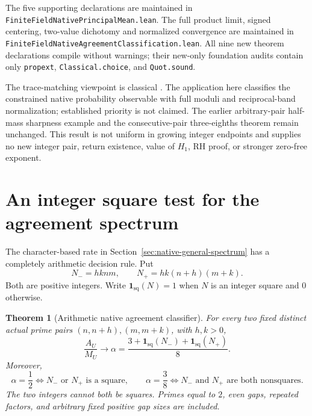 \documentclass[11pt]{article}
\newtheorem{theorem}{Theorem}[section]
\begin{document}
The five supporting declarations are maintained in
\texttt{FiniteFieldNativePrincipalMean.lean}.
The full product limit, signed centering, two-value dichotomy and
normalized convergence are maintained in
\texttt{FiniteFieldNativeAgreementClassification.lean}.
All nine new theorem declarations compile without warnings;
their new-only foundation audits contain only
\texttt{propext}, \texttt{Classical.choice}, and \texttt{Quot.sound}.

The trace-matching viewpoint is classical
\cite[Definition~1.1 and Theorem~1.2]{WaljiMatchingDensities}.
The application here classifies the constrained native probability
observable with full moduli and reciprocal-band normalization;
established priority is not claimed.
The earlier arbitrary-pair half-mass sharpness example and the
consecutive-pair three-eighths theorem remain unchanged.
This result is not uniform in growing integer endpoints and supplies
no new integer pair, return existence, value of \(H_1\), RH proof,
or stronger zero-free exponent.

\section{An integer square test for the agreement spectrum}
\label{sec:native-arithmetic-spectrum}
The character-based rate in Section~\ref{sec:native-general-spectrum}
has a completely arithmetic decision rule. Put
\[
 N_-=hknm,\qquad N_+=hk(n+h)(m+k).
\]
Both are positive integers. Write \(\mathbf1_{\mathrm{sq}}(N)=1\) when
\(N\) is an integer square and \(0\) otherwise.

\begin{theorem}[Arithmetic native agreement classifier]
\label{thm:native-arithmetic-spectrum}
For every two fixed distinct actual prime pairs
\((n,n+h),(m,m+k)\), with \(h,k>0\),
\[
 \frac{A_U}{M_U}\longrightarrow
 \alpha=\frac{3+\mathbf1_{\mathrm{sq}}(N_-)+\mathbf1_{\mathrm{sq}}(N_+)}8.
\]
Moreover,
\[
 \alpha=\frac12
 \iff N_-\text{ or }N_+\text{ is a square},\qquad
 \alpha=\frac38
 \iff N_-\text{ and }N_+\text{ are both nonsquares}.
\]
The two integers cannot both be squares. Primes equal to \(2\),
even gaps, repeated factors, and arbitrary fixed positive gap sizes
are included.
\end{theorem}
\end{document}
